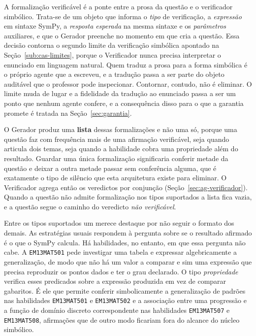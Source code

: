 A formalização verificável é a ponte entre a prosa da questão e o verificador simbólico. Trata-se
de um objeto que informa o \emph{tipo} de verificação, a \emph{expressão} em sintaxe SymPy, a
\emph{resposta esperada} na mesma sintaxe e os \emph{parâmetros} auxiliares, e que o Gerador
preenche no momento em que cria a questão. Essa decisão contorna o segundo limite da verificação
simbólica apontado na Seção~\ref{sub:cas-limites}, porque o Verificador nunca precisa interpretar o
enunciado em linguagem natural. Quem traduz a prosa para a forma simbólica é o próprio agente que a
escreveu, e a tradução passa a ser parte do objeto auditável que o professor pode inspecionar.
Contornar, contudo, não é eliminar. O limite muda de lugar e a fidelidade da tradução ao enunciado
passa a ser um ponto que nenhum agente confere, e a consequência disso para o que a garantia
promete é tratada na Seção~\ref{sec:garantia}.

O Gerador produz uma \textbf{lista} dessas formalizações e não uma só, porque uma questão faz com
frequência mais de uma afirmação verificável, seja quando articula dois temas, seja quando a
habilidade cobra uma propriedade além do resultado. Guardar uma única formalização significaria
conferir metade da questão e deixar a outra metade passar sem conferência alguma, que é
exatamente o tipo de silêncio que esta arquitetura existe para eliminar. O Verificador agrega então
os veredictos por conjunção (Seção~\ref{sec:ag-verificador}). Quando a questão não admite
formalização nos tipos suportados a lista fica vazia, e a questão segue o caminho do veredicto
\emph{não verificável}.

Entre os tipos suportados um merece destaque por não seguir o formato dos demais. As estratégias
usuais respondem à pergunta sobre se o resultado afirmado é o que o SymPy calcula. Há habilidades,
no entanto, em que essa pergunta não cabe. A \texttt{EM13MAT501} pede investigar uma tabela e
expressar algebricamente a generalização, de modo que não há um valor a comparar e sim uma
expressão que precisa reproduzir os pontos dados e ter o grau declarado. O tipo
\emph{propriedade} verifica esses predicados sobre a expressão produzida em vez de comparar
gabaritos. É ele que permite conferir simbolicamente a generalização de padrões nas habilidades
\texttt{EM13MAT501} e \texttt{EM13MAT502} e a associação entre uma progressão e a função de domínio
discreto correspondente nas habilidades \texttt{EM13MAT507} e \texttt{EM13MAT508}, afirmações que
de outro modo ficariam fora do alcance do núcleo simbólico.

